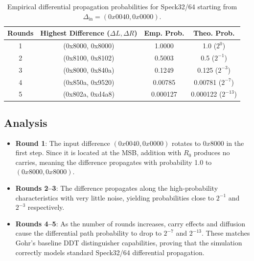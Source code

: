 \documentclass{article}
\begin{document}
\begin{table}[htbp]
\centering
\begin{tabular}{|c|c|c|c|}
\hline
\textbf{Rounds} & \textbf{Highest Difference ($\Delta L, \Delta R$)} & \textbf{Emp. Prob.} & \textbf{Theo. Prob.} \\ \hline
1 & (0x8000, 0x8000) & 1.0000 & 1.0 ($2^0$) \\ \hline
2 & (0x8100, 0x8102) & 0.5003 & 0.5 ($2^{-1}$) \\ \hline
3 & (0x8000, 0x840a) & 0.1249 & 0.125 ($2^{-3}$) \\ \hline
4 & (0x850a, 0x9520) & 0.00785 & 0.00781 ($2^{-7}$) \\ \hline
5 & (0x802a, 0xd4a8) & 0.000127 & 0.000122 ($2^{-13}$) \\ \hline
\end{tabular}
\caption{Empirical differential propagation probabilities for Speck32/64 starting from $\Delta_{\text{in}} = (0x0040, 0x0000)$.}
\label{tab:diff_results}
\end{table}

\subsection{Analysis}
\begin{itemize}
    \item \textbf{Round 1}: The input difference $(0x0040, 0x0000)$ rotates to $0x8000$ in the first step. Since it is located at the MSB, addition with $R_0$ produces no carries, meaning the difference propagates with probability 1.0 to $(0x8000, 0x8000)$.
    \item \textbf{Rounds 2--3}: The difference propagates along the high-probability characteristics with very little noise, yielding probabilities close to $2^{-1}$ and $2^{-3}$ respectively.
    \item \textbf{Rounds 4--5}: As the number of rounds increases, carry effects and diffusion cause the differential path probability to drop to $2^{-7}$ and $2^{-13}$. These matches Gohr's baseline DDT distinguisher capabilities, proving that the simulation correctly models standard Speck32/64 differential propagation.
\end{itemize}
\end{document}
